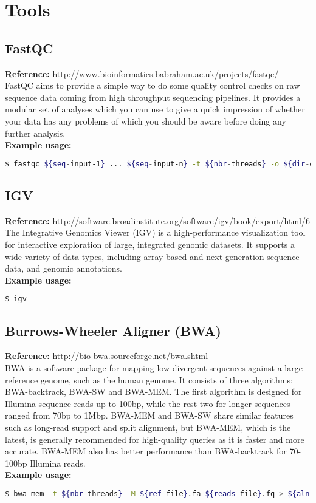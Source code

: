 \documentclass[8pt]{article}
\begin{document}
\section*{Tools}

\subsection*{FastQC}
\textbf{Reference:} \url{http://www.bioinformatics.babraham.ac.uk/projects/fastqc/}\\
FastQC aims to provide a simple way to do some quality control checks on raw sequence data coming from high throughput sequencing pipelines. It provides a modular set of analyses which you can use to give a quick impression of whether your data has any problems of which you should be aware before doing any further analysis. \\
\textbf{Example usage:}
\begin{lstlisting}[language=bash]
$ fastqc ${seq-input-1} ... ${seq-input-n} -t ${nbr-threads} -o ${dir-output}
\end{lstlisting}

\subsection*{IGV}
\textbf{Reference:} \url{http://software.broadinstitute.org/software/igv/book/export/html/6}\\
The Integrative Genomics Viewer (IGV) is a high-performance visualization tool for interactive exploration of large, integrated genomic datasets. It supports a wide variety of data types, including array-based and next-generation sequence data, and genomic annotations.\\
\textbf{Example usage:}
\begin{lstlisting}[language=bash]
$ igv
\end{lstlisting}

\subsection*{Burrows-Wheeler Aligner (BWA)}
\textbf{Reference:} \url{http://bio-bwa.sourceforge.net/bwa.shtml}\\
BWA is a software package for mapping low-divergent sequences against a large reference genome, such as the human genome. It consists of three algorithms: BWA-backtrack, BWA-SW and BWA-MEM. The first algorithm is designed for Illumina sequence reads up to 100bp, while the rest two for longer sequences ranged from 70bp to 1Mbp. BWA-MEM and BWA-SW share similar features such as long-read support and split alignment, but BWA-MEM, which is the latest, is generally recommended for high-quality queries as it is faster and more accurate. BWA-MEM also has better performance than BWA-backtrack for 70-100bp Illumina reads. 
\\
\textbf{Example usage:}
\begin{lstlisting}[language=bash]
$ bwa mem -t ${nbr-threads} -M ${ref-file}.fa ${reads-file}.fq > ${aln-se-file}.sam 
\end{lstlisting}
\end{document}
